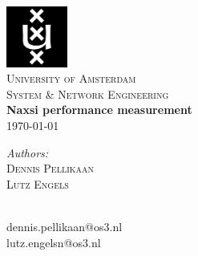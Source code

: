 \documentclass{article}
\begin{document}
\begin{titlepage}
\begin{center}
\includegraphics[width=0.15\textwidth]{images/uva-logo.png}\\[1cm]
\textsc{\LARGE University of Amsterdam}\\[0.5cm]
\textsc{\Large System \& Network Engineering}\\[2cm]
{\huge \bfseries Naxsi performance measurement}\\[0.2cm]
{\large \today}\\
\end{center}

\vfill

\begin{minipage}[t]{0.4\textwidth}
\begin{flushleft} \large
\emph{Authors:}\\
\textsc{Dennis Pellikaan}\\
\textsc{Lutz Engels}\\[1cm]
\end{flushleft}
\end{minipage}
\begin{minipage}[t]{0.4\textwidth}
\begin{flushright} \large
\mbox{ }\\
dennis.pellikaan@os3.nl\\
lutz.engelsn@os3.nl\\
\end{flushright}
\end{minipage}
\end{titlepage}


\newpage
\tableofcontents









\appendix



\end{document}
